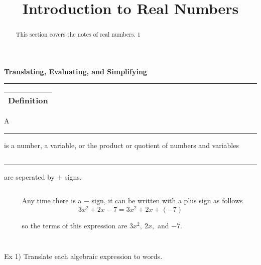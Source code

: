 \documentclass{ximera}
\title{Introduction to Real Numbers}
\begin{document}
\begin{abstract}
This section covers the notes of real numbers. 1
\end{abstract}


{\LARGE \hspace{1in} \textbf{ Translating, Evaluating, and Simplifying}}

\noindent \rule{7.35in}{2pt}

\vspace{.2in}

\noindent \begin{tabular}{|c|}
\hline 
Definition\\
\hline 
\end{tabular} A \rule{1in}{.5pt} is a number, a variable, or the product or quotient of numbers and variables

$~$

\rule{1in}{.5pt} are seperated by $\displaystyle +$ signs.

$~$

$~~~~~~~~~~$ Any time there is a $\displaystyle -$ sign, it can be written with a plus sign as follows $$3x^2+2x-7=3x^2+2x+(-7)$$ 

$~~~~~~~~~~$ so the terms of this expression are $3x^2, ~ 2x,$ and $-7$.

$~$

$~$



\noindent Ex 1)  Translate each algebraic expression to words.

$~$
\end{document}
